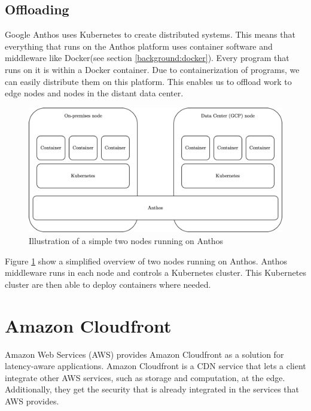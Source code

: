 \subsection{Offloading}
Google Anthos uses Kubernetes\cite{noauthor_production-grade_nodate} to create distributed systems\cite{noauthor_anthos_nodate}. This means that everything that runs on the Anthos platform uses container software and middleware like Docker(see section \ref{background:docker}). Every program that runs on it is within a Docker container. Due to containerization of programs, we can easily distribute them on this platform. This enables us to offload work to edge nodes and nodes in the distant data center.
\begin{figure}[t]
    \centering
    \includegraphics[scale=0.9]{chapters/4_architectures/figures/anthos_architecture.png}
    \caption{Illustration of a simple two nodes running on Anthos}
    \label{fig:Anthos_architecture}
\end{figure}
Figure \ref{fig:Anthos_architecture} show a simplified overview of two nodes running on Anthos. Anthos middleware runs in each node and controls a Kubernetes cluster. This Kubernetes cluster are then able to deploy containers where needed.



\section{Amazon Cloudfront}
Amazon Web Services (AWS) provides Amazon Cloudfront as a solution for latency-aware applications\cite{noauthor_production-grade_nodate}. Amazon Cloudfront is a CDN service that lets a client integrate other AWS services, such as storage and computation, at the edge. Additionally, they get the security that is already integrated in the services that AWS provides. 

